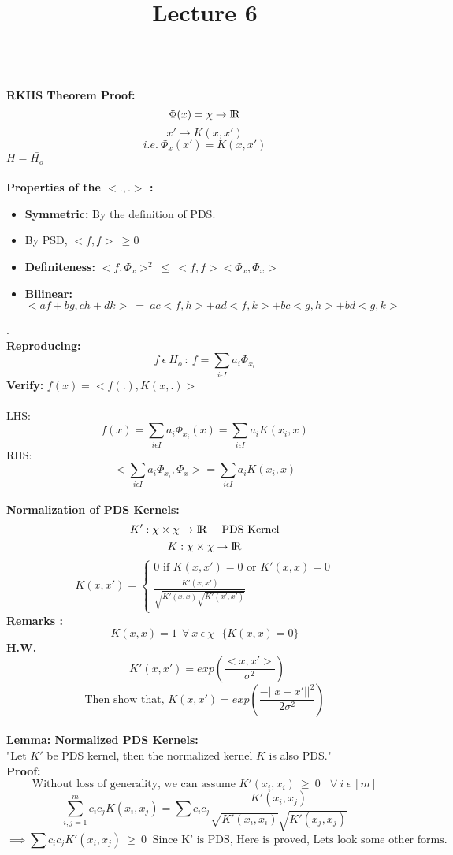 \documentclass{article}
\begin{document}
	\sffamily
	\title{Lecture 6}
	\maketitle
	\textbf{\\RKHS Theorem Proof:}
	\\	
	$$\Phi(x) = \chi \rightarrow \rm I\!R$$
	$$x'\rightarrow K(x,x')$$
	$$i.e.~\Phi_x(x')=K(x,x')$$
	$H=\bar{H_o}$
	\\\\
	\textbf{Properties of the $<.,.>$ :}
	\begin{itemize}
		\item \textbf{Symmetric:} By the definition of PDS.
		\item By PSD, $<f,f>~\geq 0$
		\item \textbf{Definiteness:} $<f,\Phi_x>^2~\leq~<f,f><\Phi_x,\Phi_x>$
		\item \textbf{Bilinear:} $<af+bg,ch+dk>~=~ac<f,h>+ad<f,k>+bc<g,h>+bd<g,k>$ 
	\end{itemize}
	.\\
	\textbf{Reproducing:}
	$$f~\epsilon~H_o~:~f=\sum_{i\epsilon I}a_i\Phi_{x_i}$$
	\textbf{Verify:} $f(x)=<f(.),K(x,.)>$
	\\\\
	LHS: $$f(x)=\sum_{i\epsilon I}a_i\Phi_{x_i}(x)=\sum_{i\epsilon I}a_i K(x_i,x)$$
	RHS: $$<\sum_{i\epsilon I}a_i\Phi_{x_i},\Phi_x>=\sum_{i\epsilon I}a_iK(x_i,x)$$
	\\
	\textbf{Normalization of PDS Kernels:}
	$$K':\chi \times \chi \rightarrow \rm I\!R~~~~PDS~Kernel$$
	$$K:\chi \times \chi \rightarrow \rm I\!R$$
	\[
	K(x,x')=
	\begin{cases}
	0 \text{ if } K(x,x')=0 \text{ or } K'(x,x)=0 \\
	\frac{K'(x,x')}{\sqrt{K'(x,x)\sqrt{K'(x',x')}}}
	\end{cases}
	\]
	\textbf{Remarks :}
	$$K(x,x)=1~~\forall~x~\epsilon~\chi~~~\{K(x,x)=0\}$$
	\textbf{H.W.}$$~~K'(x,x')=exp(\frac{<x,x'>}{\sigma^2})$$
	$$\text{Then show that, }K(x,x')=exp(\frac{-||x-x'||^2}{2\sigma^2})$$
	\\
	\textbf{Lemma: Normalized PDS Kernels:}\\
	"Let $K'$ be PDS kernel, then the normalized kernel $K$ is also PDS."\\
	\textbf{Proof:}
	$$\text{Without loss of generality, we can assume }K'(x_i,x_i)~\geq~0~~~~\forall~i~\epsilon~[m]$$
	$$\sum_{i,j=1}^{m}c_ic_jK(x_i,x_j)=\sum c_ic_j\frac{K'(x_i,x_j)}{\sqrt{K'(x_i,x_i)}\sqrt{K'(x_j,x_j)}}$$
	$$\implies\sum c_ic_jK'(x_i,x_j)~\geq~0~\text{ Since K' is PDS, Here is proved, Lets look some other forms.}$$
\end{document}
